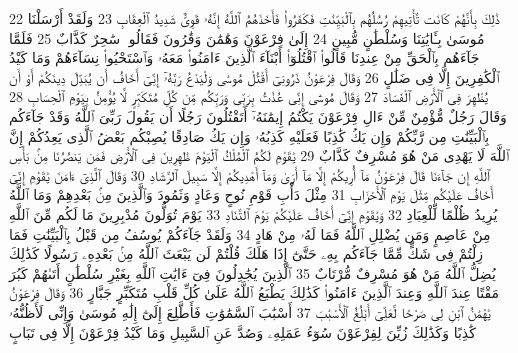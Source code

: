 {\tiny\colorbox{cl_aya}{22}} ذَٰلِكَ بِأَنَّهُمْ كَانَت تَّأْتِيهِمْ رُسُلُهُم بِٱلْبَيِّنَٰتِ فَكَفَرُوا۟ فَأَخَذَهُمُ ٱللَّهُ إِنَّهُۥ قَوِىٌّ شَدِيدُ ٱلْعِقَابِ
{\tiny\colorbox{cl_aya}{23}} وَلَقَدْ أَرْسَلْنَا مُوسَىٰ بِـَٔايَٰتِنَا وَسُلْطَٰنٍ مُّبِينٍ
{\tiny\colorbox{cl_aya}{24}} إِلَىٰ فِرْعَوْنَ وَهَٰمَٰنَ وَقَٰرُونَ فَقَالُوا۟ سَٰحِرٌ كَذَّابٌ
{\tiny\colorbox{cl_aya}{25}} فَلَمَّا جَآءَهُم بِٱلْحَقِّ مِنْ عِندِنَا قَالُوا۟ ٱقْتُلُوٓا۟ أَبْنَآءَ ٱلَّذِينَ ءَامَنُوا۟ مَعَهُۥ وَٱسْتَحْيُوا۟ نِسَآءَهُمْ وَمَا كَيْدُ ٱلْكَٰفِرِينَ إِلَّا فِى ضَلَٰلٍ
{\tiny\colorbox{cl_aya}{26}} وَقَالَ فِرْعَوْنُ ذَرُونِىٓ أَقْتُلْ مُوسَىٰ وَلْيَدْعُ رَبَّهُۥٓ إِنِّىٓ أَخَافُ أَن يُبَدِّلَ دِينَكُمْ أَوْ أَن يُظْهِرَ فِى ٱلْأَرْضِ ٱلْفَسَادَ
{\tiny\colorbox{cl_aya}{27}} وَقَالَ مُوسَىٰٓ إِنِّى عُذْتُ بِرَبِّى وَرَبِّكُم مِّن كُلِّ مُتَكَبِّرٍ لَّا يُؤْمِنُ بِيَوْمِ ٱلْحِسَابِ
{\tiny\colorbox{cl_aya}{28}} وَقَالَ رَجُلٌ مُّؤْمِنٌ مِّنْ ءَالِ فِرْعَوْنَ يَكْتُمُ إِيمَٰنَهُۥٓ أَتَقْتُلُونَ رَجُلًا أَن يَقُولَ رَبِّىَ ٱللَّهُ وَقَدْ جَآءَكُم بِٱلْبَيِّنَٰتِ مِن رَّبِّكُمْ وَإِن يَكُ كَٰذِبًا فَعَلَيْهِ كَذِبُهُۥ وَإِن يَكُ صَادِقًا يُصِبْكُم بَعْضُ ٱلَّذِى يَعِدُكُمْ إِنَّ ٱللَّهَ لَا يَهْدِى مَنْ هُوَ مُسْرِفٌ كَذَّابٌ
{\tiny\colorbox{cl_aya}{29}} يَٰقَوْمِ لَكُمُ ٱلْمُلْكُ ٱلْيَوْمَ ظَٰهِرِينَ فِى ٱلْأَرْضِ فَمَن يَنصُرُنَا مِنۢ بَأْسِ ٱللَّهِ إِن جَآءَنَا قَالَ فِرْعَوْنُ مَآ أُرِيكُمْ إِلَّا مَآ أَرَىٰ وَمَآ أَهْدِيكُمْ إِلَّا سَبِيلَ ٱلرَّشَادِ
{\tiny\colorbox{cl_aya}{30}} وَقَالَ ٱلَّذِىٓ ءَامَنَ يَٰقَوْمِ إِنِّىٓ أَخَافُ عَلَيْكُم مِّثْلَ يَوْمِ ٱلْأَحْزَابِ
{\tiny\colorbox{cl_aya}{31}} مِثْلَ دَأْبِ قَوْمِ نُوحٍ وَعَادٍ وَثَمُودَ وَٱلَّذِينَ مِنۢ بَعْدِهِمْ وَمَا ٱللَّهُ يُرِيدُ ظُلْمًا لِّلْعِبَادِ
{\tiny\colorbox{cl_aya}{32}} وَيَٰقَوْمِ إِنِّىٓ أَخَافُ عَلَيْكُمْ يَوْمَ ٱلتَّنَادِ
{\tiny\colorbox{cl_aya}{33}} يَوْمَ تُوَلُّونَ مُدْبِرِينَ مَا لَكُم مِّنَ ٱللَّهِ مِنْ عَاصِمٍ وَمَن يُضْلِلِ ٱللَّهُ فَمَا لَهُۥ مِنْ هَادٍ
{\tiny\colorbox{cl_aya}{34}} وَلَقَدْ جَآءَكُمْ يُوسُفُ مِن قَبْلُ بِٱلْبَيِّنَٰتِ فَمَا زِلْتُمْ فِى شَكٍّ مِّمَّا جَآءَكُم بِهِۦ حَتَّىٰٓ إِذَا هَلَكَ قُلْتُمْ لَن يَبْعَثَ ٱللَّهُ مِنۢ بَعْدِهِۦ رَسُولًا كَذَٰلِكَ يُضِلُّ ٱللَّهُ مَنْ هُوَ مُسْرِفٌ مُّرْتَابٌ
{\tiny\colorbox{cl_aya}{35}} ٱلَّذِينَ يُجَٰدِلُونَ فِىٓ ءَايَٰتِ ٱللَّهِ بِغَيْرِ سُلْطَٰنٍ أَتَىٰهُمْ كَبُرَ مَقْتًا عِندَ ٱللَّهِ وَعِندَ ٱلَّذِينَ ءَامَنُوا۟ كَذَٰلِكَ يَطْبَعُ ٱللَّهُ عَلَىٰ كُلِّ قَلْبِ مُتَكَبِّرٍ جَبَّارٍ
{\tiny\colorbox{cl_aya}{36}} وَقَالَ فِرْعَوْنُ يَٰهَٰمَٰنُ ٱبْنِ لِى صَرْحًا لَّعَلِّىٓ أَبْلُغُ ٱلْأَسْبَٰبَ
{\tiny\colorbox{cl_aya}{37}} أَسْبَٰبَ ٱلسَّمَٰوَٰتِ فَأَطَّلِعَ إِلَىٰٓ إِلَٰهِ مُوسَىٰ وَإِنِّى لَأَظُنُّهُۥ كَٰذِبًا وَكَذَٰلِكَ زُيِّنَ لِفِرْعَوْنَ سُوٓءُ عَمَلِهِۦ وَصُدَّ عَنِ ٱلسَّبِيلِ وَمَا كَيْدُ فِرْعَوْنَ إِلَّا فِى تَبَابٍ

